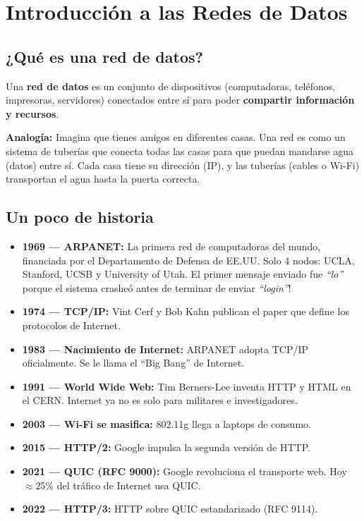 \chapter{ Introducción a las Redes de Datos}

\section{ ¿Qué es una red de datos?}

\begin{concepto}
Una \textbf{red de datos} es un conjunto de dispositivos (computadoras, teléfonos,
impresoras, servidores) conectados entre sí para poder \textbf{compartir información
y recursos}.

 \textbf{Analogía:} Imagina que tienes amigos en diferentes casas.
Una red es como un sistema de tuberías que conecta todas las casas para que
puedan mandarse agua (datos) entre sí. Cada casa tiene su dirección (IP), y
las tuberías (cables o Wi-Fi) transportan el agua hasta la puerta correcta.
\end{concepto}

\section{ Un poco de historia }

\begin{itemize}
    \item \textbf{1969 --- ARPANET:} La primera red de computadoras del mundo,
          financiada por el Departamento de Defensa de EE.UU. Solo 4 nodos:
          UCLA, Stanford, UCSB y University of Utah.
           El primer mensaje enviado fue \textit{``lo''}
          porque el sistema crasheó antes de terminar de enviar \textit{``login''}!
    \item \textbf{1974 --- TCP/IP:} Vint Cerf y Bob Kahn publican el paper que
          define los protocolos de Internet.
    \item \textbf{1983 --- Nacimiento de Internet:} ARPANET adopta TCP/IP
          oficialmente. Se le llama el ``Big Bang'' de Internet.
    \item \textbf{1991 --- World Wide Web:} Tim Berners-Lee inventa HTTP y HTML
          en el CERN. Internet ya no es solo para militares e investigadores.
    \item \textbf{2003 --- Wi-Fi se masifica:} 802.11g llega a laptops de consumo.
    \item \textbf{2015 --- HTTP/2:} Google impulsa la segunda versión de HTTP.
    \item \textbf{2021 --- QUIC (RFC 9000):} Google revoluciona el transporte web.
          Hoy $\approx$25\% del tráfico de Internet usa QUIC.
    \item \textbf{2022 --- HTTP/3:} HTTP sobre QUIC estandarizado (RFC 9114).
\end{itemize}

